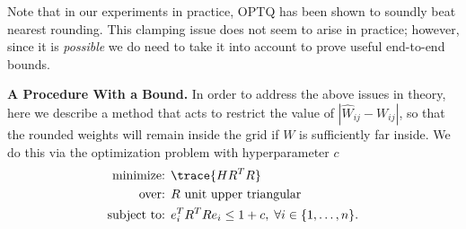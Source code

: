 Note that in our experiments in practice, OPTQ has been shown to soundly beat nearest rounding.
This clamping issue does not seem to arise in practice; however, since it is \emph{possible} we do need to take it into account to prove useful end-to-end bounds.

\textbf{A Procedure With a Bound.} In order to address the above issues in theory, here we describe a method that acts to restrict the value of $| \hat W_{ij} - W_{ij} |$, so that the rounded weights will remain inside the grid if $W$ is sufficiently far inside. We do this via the optimization problem with hyperparameter $c$
\begin{align}
    \mbox{minimize: } & \trace{H R^T R} \nonumber\\
    \mbox{over: } & R \text{ unit upper triangular} \label{eqnADMMobj}\\
    \mbox{subject to: } & e_i^T R^T R e_i \le 1 + c, \; \forall i \in \{1,\ldots,n\}.\nonumber
\end{align}

